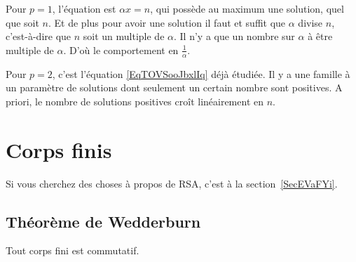 \begin{example}
    Pour \( p=1\), l'équation est \( \alpha x=n\), qui possède au maximum une solution, quel que soit \( n\). Et de plus pour avoir une solution il faut et suffit que \( \alpha\) divise \( n\), c'est-à-dire que \( n\) soit un multiple de \( \alpha\). Il n'y a que un nombre sur \( \alpha\) à être multiple de \( \alpha\). D'où le comportement en \( \frac{1}{ \alpha }\).

    Pour \( p=2\), c'est l'équation \eqref{EqTOVSooJbxlIq} déjà étudiée. Il y a une famille à un paramètre de solutions dont seulement un certain nombre sont positives. A priori, le nombre de solutions positives croît linéairement en \( n\).
\end{example}

\section{Corps finis}
\label{SecCorpsFinizkAcbS}

Si vous cherchez des choses à propos de RSA, c'est à la section~\ref{SecEVaFYi}.

\subsection{Théorème de Wedderburn}

\begin{theorem}    \label{ThoMncIWA}
    Tout corps fini est commutatif.
\end{theorem}

